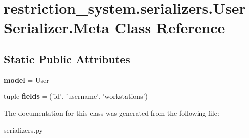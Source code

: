 \hypertarget{classrestriction__system_1_1serializers_1_1UserSerializer_1_1Meta}{}\section{restriction\+\_\+system.\+serializers.\+User\+Serializer.\+Meta Class Reference}
\label{classrestriction__system_1_1serializers_1_1UserSerializer_1_1Meta}
\subsection*{Static Public Attributes}
\begin{DoxyCompactItemize}
\item 
\hypertarget{classrestriction__system_1_1serializers_1_1UserSerializer_1_1Meta_ab658c35e9edf4bdc997a08ad174c8a47}{}{\bfseries model} = User\label{classrestriction__system_1_1serializers_1_1UserSerializer_1_1Meta_ab658c35e9edf4bdc997a08ad174c8a47}

\item 
\hypertarget{classrestriction__system_1_1serializers_1_1UserSerializer_1_1Meta_a6fa701918338b2c5bac54d42f301b2e3}{}tuple {\bfseries fields} = ('id', 'username', 'workstations')\label{classrestriction__system_1_1serializers_1_1UserSerializer_1_1Meta_a6fa701918338b2c5bac54d42f301b2e3}

\end{DoxyCompactItemize}


The documentation for this class was generated from the following file\+:\begin{DoxyCompactItemize}
\item 
serializers.\+py\end{DoxyCompactItemize}
